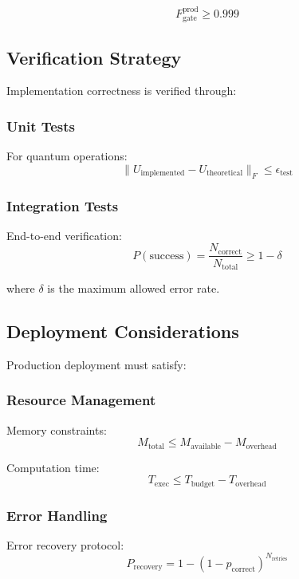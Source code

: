 \documentclass{article}
\begin{document}
\begin{equation}
F_{\text{gate}}^{\text{prod}} \geq 0.999
\end{equation}

\subsection{Verification Strategy}
Implementation correctness is verified through:

\subsubsection{Unit Tests}
For quantum operations:
\begin{equation}
\|U_{\text{implemented}} - U_{\text{theoretical}}\|_F \leq \epsilon_{\text{test}}
\end{equation}

\subsubsection{Integration Tests}
End-to-end verification:
\begin{equation}
P(\text{success}) = \frac{N_{\text{correct}}}{N_{\text{total}}} \geq 1 - \delta
\end{equation}

where $\delta$ is the maximum allowed error rate.

\subsection{Deployment Considerations}
Production deployment must satisfy:

\subsubsection{Resource Management}
Memory constraints:
\begin{equation}
M_{\text{total}} \leq M_{\text{available}} - M_{\text{overhead}}
\end{equation}

Computation time:
\begin{equation}
T_{\text{exec}} \leq T_{\text{budget}} - T_{\text{overhead}}
\end{equation}

\subsubsection{Error Handling}
Error recovery protocol:
\begin{equation}
P_{\text{recovery}} = 1 - (1-p_{\text{correct}})^{N_{\text{retries}}}
\end{equation}
\end{document}
